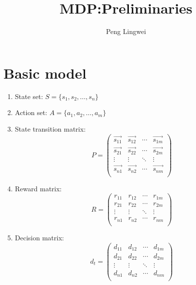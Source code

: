 \documentclass[a4paper]{article}
\title{MDP:Preliminaries}
\author{Peng Lingwei}
\numberwithin{figure}{section}
\numberwithin{equation}{section}
\begin{document}
\maketitle
\tableofcontents

\section{Basic model}%
\label{sec:basic_model}

\begin{enumerate}
    \item State set: $ S = \{ s_1, s_2, \dots, s_n \} $ 
    \item Action set: $ A = \{ a_1, a_2, \dots, a_m \} $ 
    \item State transition matrix: 
        \[
            P = 
            \begin{pmatrix}
                \vec{s_{11}} & \vec{s_{12}} & \cdots & \vec{s_{1m}} \\
                \vec{s_{21}} & \vec{s_{22}} & \cdots & \vec{s_{2m}} \\
                \vdots       & \vdots       & \ddots & \vdots  \\
                \vec{s_{n1}} & \vec{s_{n2}} & \cdots & \vec{s_{nm}} \\
            \end{pmatrix}
        \]
    \item Reward matrix:
        \[
            R =
            \begin{pmatrix}
                r_{11} & r_{12} & \cdots & r_{1m} \\
                r_{21} & r_{22} & \cdots & r_{2m} \\
                \vdots & \vdots & \ddots & \vdots \\
                r_{n1} & r_{n2} & \cdots & r_{nm} \\
            \end{pmatrix}
        \]
    \item Decision matrix:
        \[
            d_t =
            \begin{pmatrix}
                d_{11} & d_{12} & \cdots & d_{1m} \\
                d_{21} & d_{22} & \cdots & d_{2m} \\
                \vdots & \vdots & \ddots & \vdots \\
                d_{n1} & d_{n2} & \cdots & d_{nm} \\
            \end{pmatrix}
\]
\end{enumerate}
\end{document}
